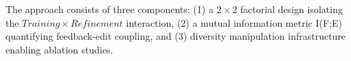 
The approach consists of three components: (1) a $2\times 2$ factorial design isolating the $Training\times Refinement$ interaction, (2) a mutual information metric I(F;E) quantifying feedback-edit coupling, and (3) diversity manipulation infrastructure enabling ablation studies.
